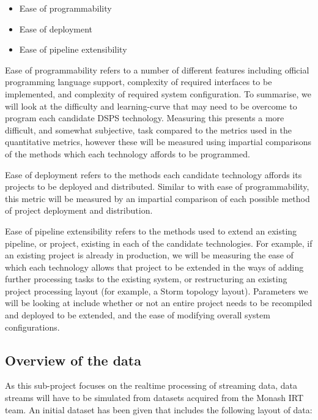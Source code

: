 \begin{itemize}
  \item Ease of programmability
  \item Ease of deployment
  \item Ease of pipeline extensibility
\end{itemize}

Ease of programmability refers to a number of different features including official programming language support, complexity
of required interfaces to be implemented, and complexity of required system configuration. To summarise, we will look at
the difficulty and learning-curve that may need to be overcome to program each candidate DSPS technology. Measuring this
presents a more difficult, and somewhat subjective, task compared to the metrics used in the quantitative metrics, however
these will be measured using impartial comparisons of the methods which each technology affords to be programmed.

Ease of deployment refers to the methods each candidate technology affords its projects to be deployed and distributed.
Similar to with ease of programmability, this metric will be measured by an impartial comparison of each possible
method of project deployment and distribution.

Ease of pipeline extensibility refers to the methods used to extend an existing pipeline, or project, existing in each
of the candidate technologies. For example, if an existing project is already in production, we will be measuring the
ease of which each technology allows that project to be extended in the ways of adding further processing tasks to the
existing system, or restructuring an existing project processing layout (for example, a Storm topology layout). Parameters
we will be looking at include whether or not an entire project needs to be recompiled and deployed to be extended, and the
ease of modifying overall system configurations.





\subsection{Overview of the data} %
\label{sub:overview_of_the_data}

As this sub-project focuses on the realtime processing of streaming data, data streams will have to be simulated from
datasets acquired from the Monash IRT team. An initial dataset has been given that includes the following layout of data:

